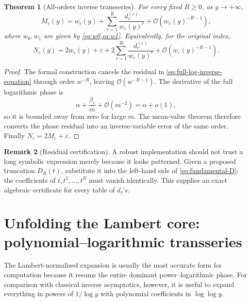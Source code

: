 \documentclass[11pt,a4paper]{article}
\theoremstyle{clean}
\newtheorem{theorem}{Theorem}[section]
\theoremstyle{definition}
\newtheorem{remark}[theorem]{Remark}
\newcommand{\eps}{\varepsilon}
\newcommand{\al}{\alpha}
\newcommand{\be}{\beta}
\newcommand{\OO}{\mathcal O}
\begin{document}
\begin{theorem}[All-orders inverse transseries]
\label{thm:inverse-main}
For every fixed \(R\ge0\), as \(y\to+\infty\),
\begin{equation}
 \boxed{\displaystyle
 M_\eps(y)=w_\eps(y)+\sum_{r=1}^R
 \frac{d_r^{(\eps)}}{w_\eps(y)^r}
 +\OO\!\left(w_\eps(y)^{-R-1}\right),}
 \label{eq:inverse-fixed-R}
\end{equation}
where \(w_0,w_1\) are given by \cref{eq:w0,eq:w1}.  Equivalently, for the original index,
\begin{equation}
 \boxed{\displaystyle
 N_\eps(y)=2w_\eps(y)+\eps+2\sum_{r=1}^R
 \frac{d_r^{(\eps)}}{w_\eps(y)^r}
 +\OO\!\left(w_\eps(y)^{-R-1}\right).}
 \label{eq:N-inverse-fixed-R}
\end{equation}
\end{theorem}

\begin{proof}
The formal construction cancels the residual in \cref{eq:full-log-inverse-equation} through order \(w^{-R}\), leaving \(\OO(w^{-R-1})\).  The derivative of the full logarithmic phase is
\begin{equation*}
 \al+\frac{\be_\eps}{m}+\OO(m^{-2})=\al+o(1),
\end{equation*}
so it is bounded away from zero for large \(m\).  The mean-value theorem therefore converts the phase residual into an inverse-variable error of the same order.  Finally \(N_\eps=2M_\eps+\eps\).
\end{proof}

\begin{remark}[Residual certification]
A robust implementation should not trust a long symbolic expression merely because it looks patterned.  Given a proposed truncation \(D_R(t)\), substitute it into the left-hand side of \cref{eq:fundamental-D}; the coefficients of \(t,t^2,\ldots,t^R\) must vanish identically.  This supplies an exact algebraic certificate for every table of \(d_r\)'s.
\end{remark}

\section{Unfolding the Lambert core: polynomial--logarithmic transseries}
\label{sec:polylog}

The Lambert-normalized expansion is usually the most accurate form for computation because it resums the entire dominant power--logarithmic phase.  For comparison with classical inverse asymptotics, however, it is useful to expand everything in powers of \(1/\log y\) with polynomial coefficients in \(\log\log y\).
\end{document}
